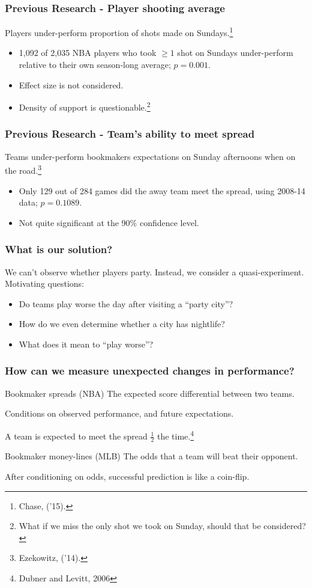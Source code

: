 \documentclass{beamer}
\begin{document}
\begin{frame}
  \frametitle{Previous Research - Player shooting average}     Players under-perform proportion of shots made on Sundays.\footnote{Chase, ('15).}
    \begin{itemize}       \item 1,092 of 2,035 NBA players who took $\geq 1$ shot on Sundays under-perform relative to their own season-long average; $p=0.001$.
      \item Effect size is not considered.
      \item Density of support is questionable.\footnote{What if we miss the only shot we took on Sunday, should that be considered?}     \end{itemize}
\end{frame}

\begin{frame}   \frametitle{Previous Research - Team's ability to meet spread}
  Teams under-perform bookmakers expectations on Sunday afternoons when on the road.\footnote{Ezekowitz, ('14).}
    \begin{itemize}       
    \item Only 129 out of 284 games did the away team meet the spread, 
      using 2008-14 data; $p=0.1089$.
    \item Not quite significant at the 90\% confidence level.     
    \end{itemize}
  \end{frame}

\begin{frame}   
  \frametitle{What is our solution?}
  \begin{block}{We can't observe whether players party.}
    Instead, we consider a quasi-experiment. Motivating questions:
    \begin{itemize}       \item Do teams play worse the day after visiting a ``party city''?
      \item How do we even determine whether a city has nightlife?    
      \item What does it mean to ``play worse''? \end{itemize}
  \end{block}
\end{frame}

\begin{frame}
  \frametitle{How can we measure unexpected changes in performance?}     \begin{block}{Bookmaker spreads (NBA)}     
    The expected score differential between two teams.

    Conditions on observed performance, and future expectations.

    A team is expected to meet the spread $\frac{1}{2}$ the time.\footnote{Dubner and Levitt, 2006}
  \end{block}
  \begin{block}{Bookmaker money-lines (MLB)}     The odds that a team will beat their opponent.

    After conditioning on odds, successful prediction is like a coin-flip.   \end{block} \end{frame}
\end{document}
